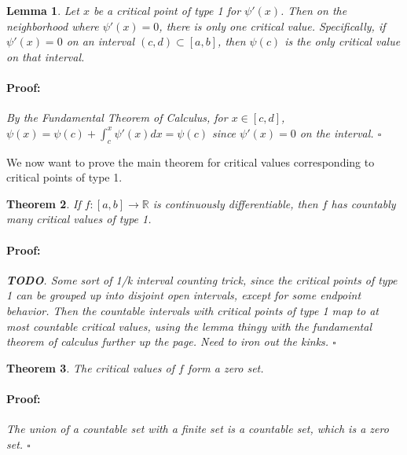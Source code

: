 \documentclass{article}
\newenvironment{proof}{\paragraph{Proof:}}{\hfill$\square$}
\newtheorem{theorem}{Theorem}
\newtheorem{lemma}[theorem]{Lemma}
\newcommand{\R}{\mathbb{R}}
\begin{document}
\begin{lemma}
Let $x$ be a critical point of type 1 for $\psi'(x)$. Then on the neighborhood where $\psi'(x) = 0$, there is only one critical value. Specifically, if $\psi'(x) = 0$ on an interval $(c, d) \subset [a, b]$, then $\psi(c)$ is the only critical value on that interval.
\begin{proof}
By the Fundamental Theorem of Calculus, for $x \in [c, d]$, $\psi(x) = \psi(c) + \int_c^x \psi'(x) dx = \psi(c)$ since $\psi'(x) = 0$ on the interval. 
\end{proof}
\end{lemma}

We now want to prove the main theorem for critical values corresponding to critical points of type 1.

\begin{theorem}
If $f: [a, b] \rightarrow \R$ is continuously differentiable, then $f$ has countably many critical values of type 1.
\begin{proof}
\textbf{TODO}. Some sort of 1/k interval counting trick, since the critical points of type 1 can be grouped up into disjoint open intervals, except for some endpoint behavior. Then the countable intervals with critical points of type 1 map to at most countable critical values, using the lemma thingy with the fundamental theorem of calculus further up the page. Need to iron out the kinks.
\end{proof}
\end{theorem}

\begin{theorem}
The critical values of $f$ form a zero set.
\begin{proof}
The union of a countable set with a finite set is a countable set, which is a zero set.
\end{proof}
\end{theorem}
\end{document}
